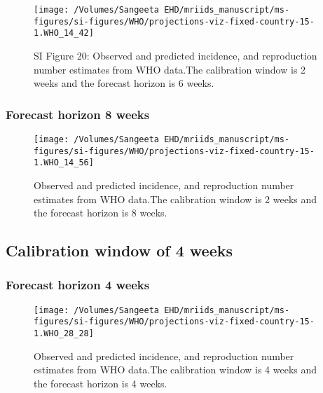\documentclass[9pt,twoside,lineno]{pnas-new}
\begin{document}
\begin{figure}

  {\centering \texttt{[image: /Volumes/Sangeeta EHD/mriids\_manuscript/ms-figures/si-figures/WHO/projections-viz-fixed-country-15-1.WHO\_14\_42]} 

  }

  \caption{SI Figure  20: Observed and predicted incidence, and
    reproduction number estimates from WHO data.The calibration window
    is 2 weeks and the forecast horizon is 6 weeks.}
  \label{fig:who26}
\end{figure}

\hypertarget{forecast-horizon-8-weeks-6}{%
  \subsubsection{Forecast horizon 8
    weeks}\label{forecast-horizon-8-weeks-6}}

\begin{figure}

  {\centering \texttt{[image: /Volumes/Sangeeta EHD/mriids\_manuscript/ms-figures/si-figures/WHO/projections-viz-fixed-country-15-1.WHO\_14\_56]} 

  }

  \caption{Observed and predicted incidence, and reproduction number
    estimates from WHO data.The calibration window is 2 weeks and the
    forecast horizon is 8 weeks.}
  \label{fig:who28}
\end{figure}

\hypertarget{calibration-window-of-4-weeks-2}{%
  \subsection{Calibration window of 4
    weeks}\label{calibration-window-of-4-weeks-2}}

\hypertarget{forecast-horizon-4-weeks-6}{%
  \subsubsection{Forecast horizon 4
    weeks}\label{forecast-horizon-4-weeks-6}}

\begin{figure}

  {\centering \texttt{[image: /Volumes/Sangeeta EHD/mriids\_manuscript/ms-figures/si-figures/WHO/projections-viz-fixed-country-15-1.WHO\_28\_28]} 

  }

  \caption{Observed and predicted incidence, and
    reproduction number estimates from WHO data.The calibration window
    is 4 weeks and the forecast horizon is 4 weeks.}
  \label{fig:who44}
\end{figure}
\end{document}
